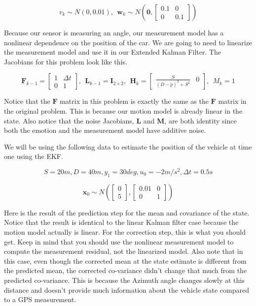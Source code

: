 \begin{equation}
v_k \sim N(0, 0.01), ~~ \mathbf{w}_k \sim N(\mathbf{0}, \begin{bmatrix} 0.1 & 0 \\ 0 & 0.1 \end{bmatrix})
\end{equation}

Because our sensor is measuring an angle, our measurement model has a nonlinear dependence on
the position of the car. We are going to need to linearize the measurement model and use it
in our Extended Kalman Filter. The Jacobians for
this problem look like this. 

\begin{equation}
\mathbf{F}_{k-1} = 
\begin{bmatrix} 
1 & \Delta t \\ 
0 & 1 
\end{bmatrix}, ~~ \mathbf{L}_{k-1} = \mathbf{I}_{2\times 2}, ~~ \mathbf{H}_k =  
\begin{bmatrix} 
\frac{S}{(D - \check{p})^2 + S^2} & 0
\end{bmatrix}, ~~ M_k = 1
\end{equation}


Notice that the $\mathbf{F}$ matrix in this problem is exactly the same as the $\mathbf{F}$ matrix
in the original problem. This is because our motion model
is already linear in the state. Also notice that
the noise Jacobians, $\mathbf{L}$ and $\mathbf{M}$, are both identity since both the emotion and the measurement
model have additive noise. 

We will be using the following data  to estimate the position of the vehicle at time one using the EKF. 

\begin{equation}
S = 20m, D= 40m, y_1 = 30 deg, u_0 = -2m/s^2, \Delta t = 0.5s
\end{equation}


\begin{equation}
\hat{\mathbf{x}}_0 \sim N(\begin{bmatrix}0 \\ 5 \end{bmatrix}, \begin{bmatrix}0.01 & 0 \\ 0 & 1 \end{bmatrix})
\end{equation}

Here is the result of the prediction step for the mean and
covariance of the state. Notice that the result is identical to the linear Kalman filter case because
the motion model actually is linear. For the correction step, this is what you should get. Keep in mind that you should use the nonlinear measurement model to
compute the measurement residual, not the linearized model. Also note that in this case, even though the corrected mean at the state estimate is different
from the predicted mean, the corrected co-variance didn't change that much from the predicted co-variance. This is because the Azimuth angle
changes slowly at this distance and doesn't provide
much information about the vehicle state compared
to a GPS measurement. 


